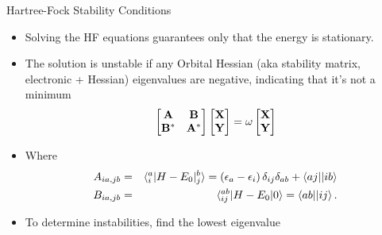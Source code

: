 \documentclass[10pt]{beamer}
\begin{document}
{{{{\begin{frame}{Hartree-Fock Stability Conditions}
	\begin{itemize}[<+->]
		\item Solving the HF equations guarantees only that the energy is \alert{stationary}.
		\item{The solution is \alert{unstable} if any \alert{Orbital Hessian} (aka stability matrix, 
		electronic +
		Hessian) eigenvalues are \alert{negative}, indicating that it's not a minimum
			\begin{eqnarray}
				\begin{bmatrix}
					\bf{A}   & \bf{B}   \\
					\bf{B}^* & \bf{A}^* \\
				\end{bmatrix}
				\begin{bmatrix}  \bf{X} \\ \bf{Y}  \end{bmatrix}
				= \omega \begin{bmatrix}  \bf{X} \\ \bf{Y}  \end{bmatrix}
			\end{eqnarray}
		}
		\item{Where}
		\begin{eqnarray}
			A_{ia,jb} &=& \braket{{}_i^a|H-E_0|{}_j^b} = \left(\epsilon_a - \epsilon_i \right) \delta_{ij}\delta_{ab} + \braket{aj||ib}
			\nonumber \\
			B_{ia,jb} &=& \braket{{}_{ij}^{ab}|H-E_0|0} = \braket{ab||ij}.
		\end{eqnarray}
		\item{To determine instabilities, find the lowest eigenvalue}
	\end{itemize}
\end{frame}


}}}}
\end{document}

